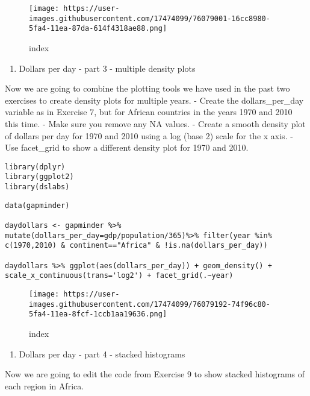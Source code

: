 \documentclass[]{article}
\providecommand{\tightlist}{%
  \setlength{\itemsep}{0pt}\setlength{\parskip}{0pt}}
\begin{document}
\begin{figure}
\centering
\texttt{[image: https://user-images.githubusercontent.com/17474099/76079001-16cc8980-5fa4-11ea-87da-614f4318ae88.png]}
\caption{index}
\end{figure}

\begin{enumerate}
\def\labelenumi{\arabic{enumi}.}
\setcounter{enumi}{8}
\tightlist
\item
  Dollars per day - part 3 - multiple density plots
\end{enumerate}

Now we are going to combine the plotting tools we have used in the past
two exercises to create density plots for multiple years. - Create the
dollars\_per\_day variable as in Exercise 7, but for African countries
in the years 1970 and 2010 this time. - Make sure you remove any NA
values. - Create a smooth density plot of dollars per day for 1970 and
2010 using a log (base 2) scale for the x axis. - Use facet\_grid to
show a different density plot for 1970 and 2010.

\begin{verbatim}
library(dplyr)
library(ggplot2)
library(dslabs)
\end{verbatim}

\begin{verbatim}
data(gapminder)

daydollars <- gapminder %>% mutate(dollars_per_day=gdp/population/365)%>% filter(year %in% c(1970,2010) & continent=="Africa" & !is.na(dollars_per_day))

daydollars %>% ggplot(aes(dollars_per_day)) + geom_density() + scale_x_continuous(trans='log2') + facet_grid(.~year)
\end{verbatim}

\begin{figure}
\centering
\texttt{[image: https://user-images.githubusercontent.com/17474099/76079192-74f96c80-5fa4-11ea-8fcf-1ccb1aa19636.png]}
\caption{index}
\end{figure}

\begin{enumerate}
\def\labelenumi{\arabic{enumi}.}
\setcounter{enumi}{9}
\tightlist
\item
  Dollars per day - part 4 - stacked histograms
\end{enumerate}

Now we are going to edit the code from Exercise 9 to show stacked
histograms of each region in Africa.
\end{document}
